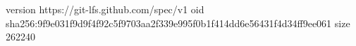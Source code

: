 version https://git-lfs.github.com/spec/v1
oid sha256:9f9e031f9d9f4f92c5f9703aa2f339e995f0b1f414dd6e56431f4d34ff9ee061
size 262240
